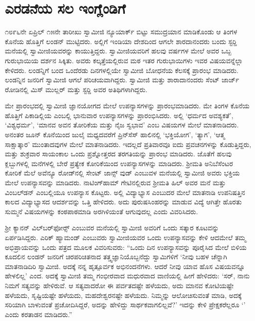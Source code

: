 
\chapter{ಎರಡನೆಯ ಸಲ ಇಂಗ್ಲೆಂಡಿಗೆ}

 ೧೮೯೬ನೇ ಏಪ್ರಿಲ್ ೧೫ನೇ ತಾರೀಖು ಸ್ವಾಮೀಜಿ ನ್ಯೂಯಾರ್ಕ್ ಬಿಟ್ಟು ಸಮುದ್ರಯಾನ ಮಾಡಿಕೊಂಡು ಆ ತಿಂಗಳ ಕೊನೆಯ ಹೊತ್ತಿಗೆ ಲಂಡನ್ ಮುಟ್ಟಿದರು. ಅಲ್ಲಿಗೆ ಇಂಡಿಯಾ ದೇಶದಿಂದ ಆಗಲೇ ಶಾರದಾನಂದರು ಬಂದು ಸ್ಟರ‍್ಡಿ ಮನೆಯಲ್ಲಿ ಸ್ವಾಮೀಜಿಯವರನ್ನು ಕಾಯುತ್ತಿದ್ದರು. ಸ್ವಾಮೀಜಿಯವರಿಗೆ ಹಲವು ವರ್ಷಗಳ ಮೇಲೆ ಅವರ ಒಬ್ಬ ಗುರುಭಾಯಿಯ ದರ್ಶನ ಸಿಕ್ಕಿತು. ಅವರು ಕಲ್ಕತ್ತೆಯಲ್ಲಿರುವ ಮಠ ಇತರ ಗುರುಭಾಯಿಗಳು ಇವರ ವಿಷಯವನ್ನೆಲ್ಲಾ ಕೇಳಿದರು. ಲಂಡನ್ನಿಗೆ ಬಂದ ಒಂದೆರಡು ದಿನಗಳಲ್ಲಿಯೇ ಸ್ವಾಮೀಜಿ ಬೋಧನೆಯ ಕೆಲಸಕ್ಕೆ ಪ್ರಾರಂಭ ಮಾಡಿದರು. ಲಂಡನ್ನಿನ ಜನರಿಗೆ ಸ್ವಾಮೀಜಿ ಆಗಲೆ ಪರಿಚಯವಾಗಿದ್ದರು. ಸ್ವಾಮೀಜಿ ಮತ್ತು ಶಾರಾದಾನಂದರು ಸೆಂಟ್ ಜಾರ್ಜ್ ರೋಡಿನಲ್ಲಿ ಮಿಸ್ ಮುಲ್ಲರ್ ಮತ್ತು ಸ್ಟರ‍್ಡಿ ಅವರ ಅತಿಥಿಗಳಾಗಿದ್ದರು. 

 ಮೇ ಪ್ರಾರಂಭದಲ್ಲಿ ಸ್ವಾಮೀಜಿ ಜ್ಞಾನಯೋಗದ ಮೇಲೆ ಉಪನ್ಯಾಸಗಳನ್ನು ಪ್ರಾರಂಭಮಾಡಿದರು. ಮೇ ತಿಂಗಳ ಕೊನೆಯ ಹೊತ್ತಿಗೆ ಪಿಕಾಡಿಲ್ಲಿಯ  ಎಂಬಲ್ಲಿ ಭಾನುವಾರ ಉಪನ್ಯಾಸಗಳನ್ನು ಪ್ರಾರಂಭಿಸಿದರು. ಅಲ್ಲಿ ‘ಧರ್ಮದ ಅವಶ್ಯಕತೆ’, ‘ವಿಶ್ವಧರ್ಮ’, ‘ಮಾನವ ಅವನ ತೋರಿಕೆಯ ಮತ್ತು ನೈಜ ಸ್ವಭಾವ’ ಎಂಬ ವಿಷಯಗಳ ಮೇಲೆ ಮಾತನಾಡಿದರು. ಅನಂತರ ಜೂನ್ ಕೊನೆಯಿಂದ ಜುಲೈ ಮಧ್ಯದವರೆಗೆ ಪ್ರಿನ್‍ಸೆಸ್ ಹಾಲಿನಲ್ಲಿ ‘ಭಕ್ತಿಯೋಗ’, ‘ತ್ಯಾಗ’, ‘ಆತ್ಮ ಸಾಕ್ಷಾತ್ಕಾರ’ ಮುಂತಾದವುಗಳ ಮೇಲೆ ಮಾತನಾಡಿದರು. ಇದಲ್ಲದೆ ಪ್ರತಿವಾರವೂ ಐದು ಪ್ರವಚನಗಳನ್ನು ಕೊಡುತ್ತಿದ್ದರು, ಮತ್ತು ಶುಕ್ರವಾರ ಸಾಯಂಕಾಲ ಒಂದು ಪ್ರಶ್ನೋತ್ತರದ ತರಗತಿಯನ್ನು ಪ್ರಾರಂಭ ಮಾಡಿದರು. ಜೊತೆಗೆ ಹಲವು ಕ್ಲಬ್ಬುಗಳಲ್ಲಿ ಮನೆಗಳಲ್ಲಿ ಬೇರೆ ಪ್ರತ್ಯೇಕ ಕೋರಿಕೆಯಿಂದ ಉಪನ್ಯಾಸಗಳನ್ನು ಮಾಡಿದರು. ಶ‍್ರೀಮತಿ ಅನಿಬೆಸೆಂಟರ ಕೋರಿಕೆ ಮೆಲೆ ಅವೆನ್ಯೂ ರೋಡ್‍ನಲ್ಲಿ ಸೇಂಟ್ ಜಾನ್ಸ್ ವುಡ್ ಎಂಬುವಳ ಮನೆಯಲ್ಲಿ ಸ್ವಾಮೀಜಿ ಅವರು ಭಕ್ತಿಯ ಮೇಲೆ ಉಪನ್ಯಾಸವನ್ನು ಮಾಡಿದರು. ನಾಟಿಂಗ್‍ಹಾಮ್ ಗೇಟಿನಲ್ಲಿರುವ ಶ‍್ರೀಮತಿ ಹಿಲ್ ಅವರ ಮನೆ ಮತ್ತು ವಿಂಬಲ್‍ಡನ್ ಎಂಬಲ್ಲಿಯೂ ಉಪನ್ಯಾಸ ಕೊಟ್ಟರು. ಅಲ್ಲಿ ವಿದ್ಯಾಭ್ಯಾಸ ಎಂಬುದರ ಮೇಲೆ ಮಾತನಾಡಿ ಉಪನಿಷತ್ತಿನ ಕಾಲದ ವಿದ್ಯಾಭ್ಯಾಸದ ಆದರ್ಶವನ್ನು ಒತ್ತಿ ಹೇಳಿದರು. ಅದು ಪುರುಷಸಿಂಹರನ್ನು ಮಾಡುವ ವಿದ್ಯೆ ಆಗಿತ್ತೇ ಹೊರತು ಸುಮ್ಮನೆ ವಿಷಯಗಳನ್ನು ಕಂಠಪಾಠಮಾಡಿ ಅರಗಿಳಿಯಂತೆ ಆಗುವುದಲ್ಲ ಎಂದು ವಿವರಿಸಿದರು. 

 ಶ‍್ರೀ ಕ್ಯಾನನ್ ವಿಲ್‌ಬರ್‌ಫೋರ್ಸ್‍ ಎಂಬುವರ ಮನೆಯಲ್ಲಿ ಸ್ವಾಮೀಜಿ ಅವರಿಗೆ ಒಂದು ಸತ್ಕಾರ ಕೂಟವನ್ನು ಏರ್ಪಡಿಸಿದ್ದರು. ಎರಿಕ್ ಹ್ಯಾಮಂಡ್ ಎಂಬುವರು ಸ್ವಾಮೀಜಿಯವರ ಒಂದು ಉಪನ್ಯಾಸವನ್ನು ಕೇಳಿ ಆದಮೇಲೆ ತಮ್ಮ ಅಭಿಪ್ರಾಯವನ್ನು ಒಂದು ಪತ್ರದ ಮೂಲಕ ವಿವರಿಸುವರು: “ಒಂದು ದಿನ ಉಪನ್ಯಾಸವನ್ನು ಪೂರೈಸಿದ ಮೇಲೆ ಬಿಳಿಯ ಕೂದಲಿನ ಲಂಡನ್ ಜನರಿಗೆ ಚಿರಪರಿಚಿತನಾದ ತತ್ತ್ವಜ್ಞಾನಿಯೊಬ್ಬನೆದ್ದು ಸ್ವಾಮಿಗಳಿಗೆ ‘ನೀವು ಬಹಳ ಚೆನ್ನಾಗಿ ಮಾತನಾಡಿದಿರಿ ಸ್ವಾಮೀಜಿ. ಅದಕ್ಕೆ ನನ್ನ ಹೃತ್ಪೂರ್ವಕ ಅಭಿನಂದನೆಗಳು. ಆದರೆ ನೀವು ಯಾವ ಹೊಸ ವಿಷಯವನ್ನೂ ಹೇಳಲಿಲ್ಲ’ ಎಂದ. ಅದಕ್ಕೆ ಸ್ವಾಮೀಜಿ ತಮ್ಮ ಗಂಭೀರವಾದ ಮಧುರವಾದ ವಾಣಿಯಲ್ಲಿ ಹೀಗೆ ಹೇಳಿದರು: ‘ಸರ್, ನಾನು ನಿಮಗೆ ಸತ್ಯವನ್ನು ಹೇಳಿರುವೆ. ಆ ಸತ್ಯವಾದರೋ ಈ ಪರ್ವತದಷ್ಟೇ ಹಳೆಯದು, ಅದು ಮಾನವ ಕೋಟಿಯಷ್ಟೇ ಹಳೆಯದು, ಸೃಷ್ಟಿಯಷ್ಟೇ ಹಳೆಯದು, ಮಹದೇಶ್ವರನಷ್ಟೇ ಹಳೆಯದು. ನಿಮ್ಮನ್ನು ಆಲೋಚಿಸುವಂತೆ ಮಾಡಿ, ಅದಕ್ಕೆ ಸರಿಯಾಗಿ ಬಾಳುವಂತೆ ಪ್ರಚೋದಿಸಿದ್ದರೆ, ಅದನ್ನು ಹೇಳಿದ್ದು ಸಾರ್ಥಕವಾಗಲಿಲ್ಲವೆ?’ ಇದನ್ನು ಕೇಳಿ ಪ್ರೇಕ್ಷಕರೆಲ್ಲರೂ ‘’ ಎಂದು ಕರತಾಡನ ಮಾಡಿದರು.” 


